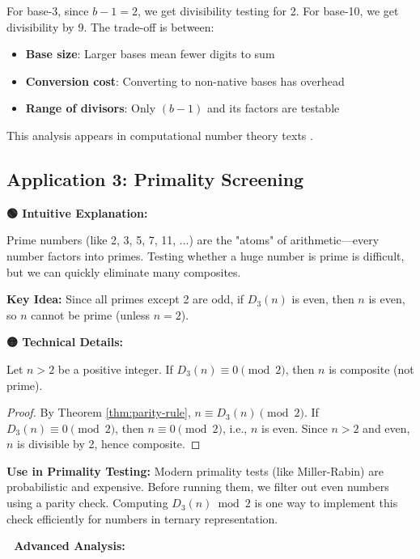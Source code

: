 For base-3, since $b-1 = 2$, we get divisibility testing for 2. For base-10, we get divisibility by 9. The trade-off is between:
\begin{itemize}
\item \textbf{Base size}: Larger bases mean fewer digits to sum
\item \textbf{Conversion cost}: Converting to non-native bases has overhead
\item \textbf{Range of divisors}: Only $(b-1)$ and its factors are testable
\end{itemize}

This analysis appears in computational number theory texts \cite{crandall2005}.

\subsection{Application 3: Primality Screening}

\textbf{🟢 Intuitive Explanation:}

Prime numbers (like 2, 3, 5, 7, 11, ...) are the "atoms" of arithmetic—every number factors into primes. Testing whether a huge number is prime is difficult, but we can quickly eliminate many composites.

\textbf{Key Idea:} Since all primes except 2 are odd, if $D_3(n)$ is even, then $n$ is even, so $n$ cannot be prime (unless $n = 2$).

\textbf{🟡 Technical Details:}

\begin{proposition}
\label{prop:parity-filter}
Let $n > 2$ be a positive integer. If $D_3(n) \equiv 0 \pmod{2}$, then $n$ is composite (not prime).
\end{proposition}

\begin{proof}
By Theorem \ref{thm:parity-rule}, $n \equiv D_3(n) \pmod{2}$. If $D_3(n) \equiv 0 \pmod{2}$, then $n \equiv 0 \pmod{2}$, i.e., $n$ is even. Since $n > 2$ and even, $n$ is divisible by 2, hence composite.
\end{proof}

\textbf{Use in Primality Testing:} Modern primality tests (like Miller-Rabin) are probabilistic and expensive. Before running them, we filter out even numbers using a parity check. Computing $D_3(n) \bmod 2$ is one way to implement this check efficiently for numbers in ternary representation.

\textbf{🔴 Advanced Analysis:}

